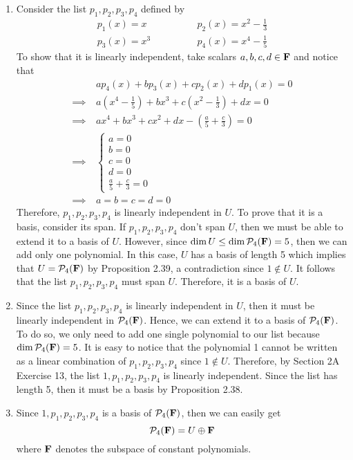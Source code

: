 \begin{solution}
    \begin{enumerate}[label=(\alph*)]
        \item Consider the list $p_1, p_2, p_3, p_4$ defined by
        \begin{align*}
            p_1(x) = x \qquad &\qquad p_2(x) = x^2-\frac{1}{3} \\
            p_3(x) = x^3 \qquad &\qquad p_4(x) = x^4 - \frac{1}{5}
        \end{align*}
        To show that it is linearly independent, take scalars $a,b,c,d \in \mathbf{F}$ and notice that
        \begin{align*}
            &ap_4(x) + bp_3(x) + cp_2(x) + dp_1(x) = 0 \\
            \implies \ & a\left(x^4 - \frac{1}{5}\right)  + bx^3 + c\left(x^2 - \frac{1}{3}\right) + dx = 0\\ 
            \implies \ & ax^4 + bx^3 + cx^2 + dx - \left(\frac{a}{5} +\frac{c}{3}\right) = 0 \\
            \implies \ & \begin{cases}
                a=0 \\ b = 0 \\ c = 0 \\ d = 0 \\ \frac{a}{5} +\frac{c}{3}= 0
            \end{cases} \\
            \implies \ & a=b=c=d=0
        \end{align*}
        Therefore, $p_1, p_2, p_3, p_4$ is linearly independent in $U$. To prove that it is a basis, consider its span. If $p_1, p_2, p_3, p_4$ don't span $U$, then we must be able to extend it to a basis of $U$. However, since $\dim U \leq \dim \mathcal{P}_4(\mathbf{F}) = 5$, then we can add only one polynomial. In this case, $U$ has a basis of length 5 which implies that $U = \mathcal{P}_4(\mathbf{F})$ by Proposition 2.39, a contradiction since $1 \notin U$. It follows that the list $p_1, p_2, p_3, p_4$ must span $U$. Therefore, it is a basis of $U$.
        \item Since the list $p_1, p_2, p_3, p_4$ is linearly independent in $U$, then it must be linearly independent in $\mathcal{P}_4(\mathbf{F})$. Hence, we can extend it to a basis of $\mathcal{P}_4(\mathbf{F})$. To do so, we only need to add one single polynomial to our list because $\dim \mathcal{P}_4(\mathbf{F}) = 5$. It is easy to notice that the polynomial 1 cannot be written as a linear combination of $p_1, p_2, p_3, p_4$ since $1 \notin U$. Therefore, by Section 2A Exercise 13, the list $1, p_1, p_2, p_3, p_4$ is linearly independent. Since the list has length 5, then it must be a basis by Proposition 2.38.
        \item Since $1, p_1, p_2, p_3, p_4$ is a basis of $\mathcal{P}_4(\mathbf{F})$, then we can easily get
        $$\mathcal{P}_4(\mathbf{F}) = U \oplus \mathbf{F}$$
        where $\mathbf{F}$ denotes the subspace of constant polynomials. \\
    \end{enumerate}
\end{solution}

